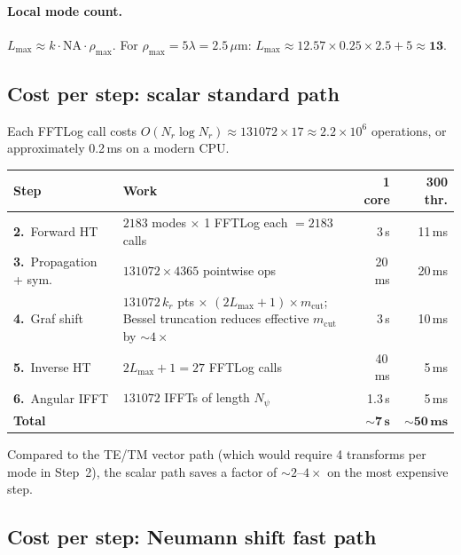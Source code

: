 \documentclass[11pt,a4paper]{article}
\begin{document}
\paragraph{Local mode count.}
$L_{\max} \approx k\cdot\mathrm{NA}\cdot\rho_{\max}$. For
$\rho_{\max} = 5\lambda = 2.5\,\mu\text{m}$:
$L_{\max} \approx 12.57 \times 0.25 \times 2.5 + 5 \approx \mathbf{13}$.

\subsection{Cost per step: scalar standard path}

Each FFTLog call costs $O(N_r\log N_r) \approx 131072 \times 17 \approx 2.2\times 10^6$
operations, or approximately 0.2\,ms on a modern CPU.

\begin{center}
\begin{tabular}{@{}l p{6cm} r r@{}}
\toprule
\textbf{Step} & \textbf{Work} & \textbf{1 core} & \textbf{300 thr.}\\
\midrule
\textbf{2.}\ Forward HT
  & $2183$ modes $\times$ 1 FFTLog each
    $= 2183$ calls
  & 3\,s & 11\,ms \\[4pt]
\textbf{3.}\ Propagation + sym.
  & $131072 \times 4365$ pointwise ops
  & 20\,ms & 20\,ms \\[4pt]
\textbf{4.}\ Graf shift
  & $131072\,k_r$ pts $\times$ $(2L_{\max}+1) \times m_{\mathrm{cut}}$;
    Bessel truncation reduces effective $m_{\mathrm{cut}}$ by ${\sim}4\times$
  & 3\,s & 10\,ms \\[4pt]
\textbf{5.}\ Inverse HT
  & $2L_{\max}+1 = 27$ FFTLog calls
  & 40\,ms & 5\,ms \\[4pt]
\textbf{6.}\ Angular IFFT
  & $131072$ IFFTs of length $N_\psi$
  & 1.3\,s & 5\,ms \\[4pt]
\midrule
\textbf{Total} & & ${\sim}\mathbf{7\,s}$ & ${\sim}\mathbf{50\,ms}$ \\
\bottomrule
\end{tabular}
\end{center}

\noindent
Compared to the TE/TM vector path (which would require 4 transforms per mode
in Step~2), the scalar path saves a factor of ${\sim}2$--$4\times$ on the
most expensive step.

\subsection{Cost per step: Neumann shift fast path}
\end{document}

